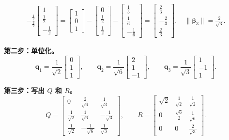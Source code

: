 \documentclass{article}
\begin{document}
\begin{align*}
- \frac{\frac12}{\frac32}\begin{bmatrix}1\\[2pt]\frac12\\[2pt]-\frac12\end{bmatrix}
= \begin{bmatrix}1\\0\\1\end{bmatrix} - \begin{bmatrix}0\\[2pt]\frac12\\[2pt]\frac12\end{bmatrix}
- \begin{bmatrix}\frac13\\[2pt]\frac16\\[2pt]-\frac16\end{bmatrix}
= \begin{bmatrix}\frac23\\[2pt]-\frac23\\[2pt]\frac23\end{bmatrix},\quad
\|\bm{\beta}_3\|=\frac{2}{\sqrt{3}}.
\end{align*}

\textbf{第二步：单位化。}
\[
\bm{q}_1 = \frac{1}{\sqrt{2}}\begin{bmatrix}0\\1\\1\end{bmatrix},\qquad
\bm{q}_2 = \frac{1}{\sqrt{6}}\begin{bmatrix}2\\1\\-1\end{bmatrix},\qquad
\bm{q}_3 = \frac{1}{\sqrt{3}}\begin{bmatrix}1\\-1\\1\end{bmatrix}.
\]

\textbf{第三步：写出 $Q$ 和 $R$。}
\[
Q = \begin{bmatrix}
0 & \frac{2}{\sqrt{6}} & \frac{1}{\sqrt{3}}\\[4pt]
\frac{1}{\sqrt{2}} & \frac{1}{\sqrt{6}} & -\frac{1}{\sqrt{3}}\\[4pt]
\frac{1}{\sqrt{2}} & -\frac{1}{\sqrt{6}} & \frac{1}{\sqrt{3}}
\end{bmatrix},\qquad
R = \begin{bmatrix}
\sqrt{2} & \frac{1}{\sqrt{2}} & \frac{1}{\sqrt{2}}\\[4pt]
0 & \frac{\sqrt{6}}{2} & \frac{1}{\sqrt{6}}\\[4pt]
0 & 0 & \frac{2}{\sqrt{3}}
\end{bmatrix}.
\]
\newpage
\end{document}
